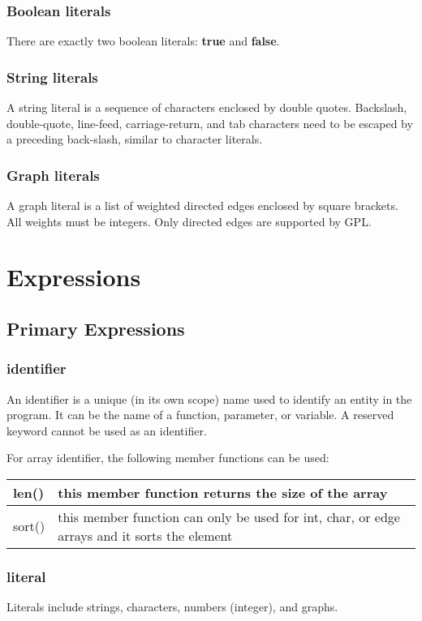 \documentclass[a4paper,12pt]{article}
\begin{document}
\subsubsection{Boolean literals}
There are exactly two boolean literals: \textbf{true} and \textbf{false}.

\subsubsection{String literals}
A string literal is a sequence of characters enclosed by double quotes. Backslash, double-quote, line-feed, carriage-return, and tab characters need to be escaped by a preceding back-slash, similar to character literals.

\subsubsection{Graph literals}
A graph literal is a list of weighted directed edges enclosed by square brackets. All weights must be integers. Only directed edges are supported by GPL.

\section{Expressions}
\subsection{Primary Expressions}
\subsubsection{identifier}
An identifier is a unique (in its own scope) name used to identify an entity in the program. It can be the name of a function, parameter, or variable.  A reserved keyword cannot be used as an identifier.

For array identifier, the following member functions can be used:
\begin{center}
\begin{tabular}{| l | p{10cm} |}
\hline
	len()		& this member function returns the size of the array \\ \hline
	sort()  & this member function can only be used for int, char, or edge arrays and it sorts the element \\ \hline
\end{tabular}
\end{center}


\subsubsection{literal}
Literals include strings, characters, numbers (integer), and graphs.
\end{document}
